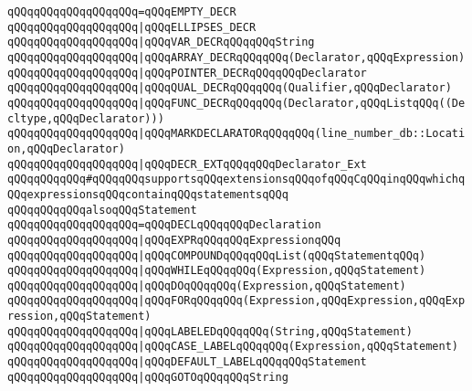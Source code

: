 \verb|qQQqqQQqqQQqqQQqqQQq=qQQqEMPTY_DECR|\newline
\verb|qQQqqQQqqQQqqQQqqQQq|\verb#|qQQqELLIPSES_DECR#\newline
\verb|qQQqqQQqqQQqqQQqqQQq|\verb#|qQQqVAR_DECRqQQqqQQqString#\newline
\verb|qQQqqQQqqQQqqQQqqQQq|\verb#|qQQqARRAY_DECRqQQqqQQq(Declarator,qQQqExpression)#\newline
\verb|qQQqqQQqqQQqqQQqqQQq|\verb#|qQQqPOINTER_DECRqQQqqQQqDeclarator#\newline
\verb|qQQqqQQqqQQqqQQqqQQq|\verb#|qQQqQUAL_DECRqQQqqQQq(Qualifier,qQQqDeclarator)#\newline
\verb|qQQqqQQqqQQqqQQqqQQq|\verb#|qQQqFUNC_DECRqQQqqQQq(Declarator,qQQqListqQQq((Decltype,qQQqDeclarator)))#\newline
\verb|qQQqqQQqqQQqqQQqqQQq|\verb#|qQQqMARKDECLARATORqQQqqQQq(line_number_db::Location,qQQqDeclarator)#\newline
\verb|qQQqqQQqqQQqqQQqqQQq|\verb#|qQQqDECR_EXTqQQqqQQqDeclarator_Ext#\newline
\newline
\verb|qQQqqQQqqQQq#qQQqqQQqsupportsqQQqextensionsqQQqofqQQqCqQQqinqQQqwhichqQQqexpressionsqQQqcontainqQQqstatementsqQQq|\newline
\verb|qQQqqQQqqQQqalsoqQQqStatement|\newline
\verb|qQQqqQQqqQQqqQQqqQQq=qQQqDECLqQQqqQQqDeclaration|\newline
\verb|qQQqqQQqqQQqqQQqqQQq|\verb#|qQQqEXPRqQQqqQQqExpressionqQQq#\newline
\verb|qQQqqQQqqQQqqQQqqQQq|\verb#|qQQqCOMPOUNDqQQqqQQqList(qQQqStatementqQQq)#\newline
\verb|qQQqqQQqqQQqqQQqqQQq|\verb#|qQQqWHILEqQQqqQQq(Expression,qQQqStatement)#\newline
\verb|qQQqqQQqqQQqqQQqqQQq|\verb#|qQQqDOqQQqqQQq(Expression,qQQqStatement)#\newline
\verb|qQQqqQQqqQQqqQQqqQQq|\verb#|qQQqFORqQQqqQQq(Expression,qQQqExpression,qQQqExpression,qQQqStatement)#\newline
\verb|qQQqqQQqqQQqqQQqqQQq|\verb#|qQQqLABELEDqQQqqQQq(String,qQQqStatement)#\newline
\verb|qQQqqQQqqQQqqQQqqQQq|\verb#|qQQqCASE_LABELqQQqqQQq(Expression,qQQqStatement)#\newline
\verb|qQQqqQQqqQQqqQQqqQQq|\verb#|qQQqDEFAULT_LABELqQQqqQQqStatement#\newline
\verb|qQQqqQQqqQQqqQQqqQQq|\verb#|qQQqGOTOqQQqqQQqString#\newline
